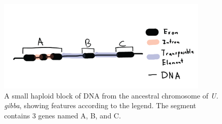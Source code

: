 \documentclass[]{article}
\begin{document}
\begin{enumerate}
\begin{figure}[h]
  \begin{center}
   \includegraphics[width=100mm]{images/minute_gene_block.png}
\caption{A small haploid block of DNA from the ancestral chromosome of \emph{U. gibba}, showing features according to the legend.  The segment contains 3 genes named A, B, and C.}
\label{minute}
  \end{center}
\end{figure}

\end{enumerate}
\end{document}
